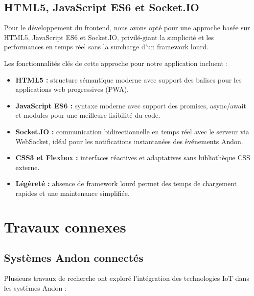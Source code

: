 \subsection{HTML5, JavaScript ES6 et Socket.IO}

Pour le d\'eveloppement du frontend, nous avons opt\'e pour une approche bas\'ee sur HTML5, JavaScript ES6 et Socket.IO, privil\'e-giant la simplicit\'e et les performances en temps r\'eel sans la surcharge d'un framework lourd.

Les fonctionnalit\'es cl\'es de cette approche pour notre application incluent :

\begin{itemize}
    \item \textbf{HTML5 :} structure s\'emantique moderne avec support des balises pour les applications web progressives (PWA).
    \item \textbf{JavaScript ES6 :} syntaxe moderne avec support des promises, async/await et modules pour une meilleure lisibilit\'e du code.
    \item \textbf{Socket.IO :} communication bidirectionnelle en temps r\'eel avec le serveur via WebSocket, id\'eal pour les notifications instantan\'ees des \'ev\'enements Andon.
    \item \textbf{CSS3 et Flexbox :} interfaces r\'eactives et adaptatives sans biblioth\`eque CSS externe.
    \item \textbf{L\'eg\`eret\'e :} absence de framework lourd permet des temps de chargement rapides et une maintenance simplifi\'ee.
\end{itemize}

\section{Travaux connexes}

\subsection{Syst\`emes Andon connect\'es}

Plusieurs travaux de recherche ont explor\'e l'int\'egration des technologies IoT dans les syst\`emes Andon :

